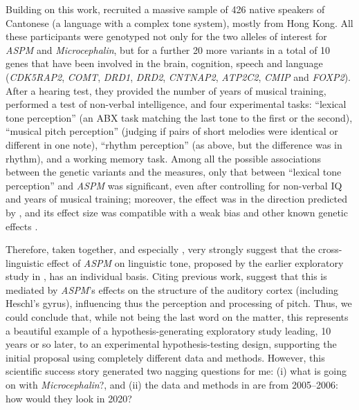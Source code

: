 \documentclass[twoside,onecolumn]{article}
\begin{document}
Building on this work, \citet{wong_sciadv_2020} recruited a massive sample of 426 native speakers of Cantonese (a language with a complex tone system), mostly from Hong Kong.
All these participants were genotyped not only for the two alleles of interest for \textit{ASPM} and \textit{Microcephalin}, but for a further 20 more variants in a total of 10 genes that have been involved in the brain, cognition, speech and language (\textit{CDK5RAP2}, \textit{COMT}, \textit{DRD1}, \textit{DRD2}, \textit{CNTNAP2}, \textit{ATP2C2}, \textit{CMIP} and \textit{FOXP2}).
After a hearing test, they provided the number of years of musical training, performed a test of non-verbal intelligence, and four experimental tasks: ``lexical tone perception'' (an ABX task matching the last tone to the first or the second), ``musical pitch perception'' (judging if pairs of short melodies were identical or different in one note), ``rhythm perception'' (as above, but the difference was in rhythm), and a working memory task.
Among all the possible associations between the genetic variants and the measures, only that between ``lexical tone perception'' and \textit{ASPM} was significant, even after controlling for non-verbal IQ and years of musical training; moreover, the effect was in the direction predicted by \citet{dediu_language_2017}, and its effect size was compatible with a weak bias and other known genetic effects \citep{wong_sciadv_2020}.

Therefore, taken together, \citet{wong_plosone_2012} and especially \citet{wong_sciadv_2020}, very strongly suggest that the cross-linguistic effect of \textit{ASPM} on linguistic tone, proposed by the earlier exploratory study in \citet{dediu_language_2017}, has an individual basis.
Citing previous work, \citet{wong_sciadv_2020} suggest that this is mediated by \textit{ASPM}'s effects on the structure of the auditory cortex (including Heschl’s gyrus), influencing thus the perception and processing of pitch.
Thus, we could conclude that, while not being the last word on the matter, this represents a beautiful example of a hypothesis-generating exploratory study leading, 10 years or so later, to an experimental hypothesis-testing design, supporting the initial proposal using completely different data and methods.
However, this scientific success story generated two nagging questions for me: (i) what is going on with \textit{Microcephalin}?, and (ii) the data and methods in \citet{dediu_language_2017} are from 2005--2006: how would they look in 2020?
\end{document}
